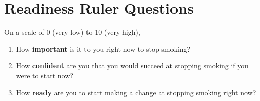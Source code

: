 \chapter{Readiness Ruler Questions}
\begin{tcolorbox}[floatplacement=pthb!,
                  fonttitle=\bfseries,
                  fontupper=\small] 

\label{appendix:readiness_rulers}

On a scale of 0 (very low) to 10 (very high),
\begin{enumerate}[itemsep=0pt]
    \item How \textbf{important} is it to you right now to stop smoking?
    \item How \textbf{confident} are you that you would succeed at stopping smoking if you were to start now?
    \item How \textbf{ready} are you to start making a change at stopping smoking right now?
\end{enumerate}

\end{tcolorbox}